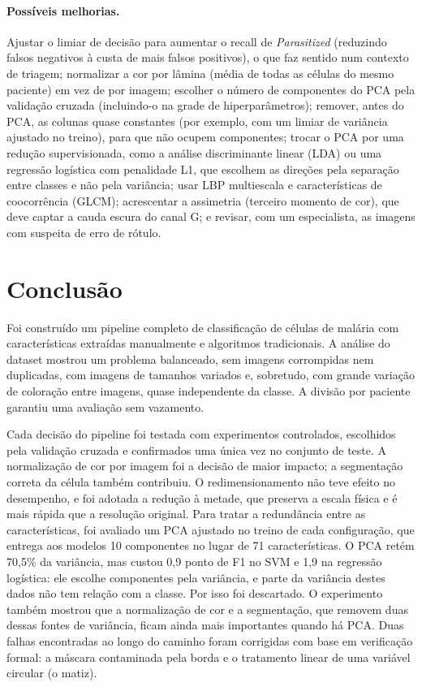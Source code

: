 \documentclass[11pt,a4paper]{article}
\begin{document}
\paragraph{Possíveis melhorias.} Ajustar o limiar de decisão para aumentar o recall de
\textit{Parasitized} (reduzindo falsos negativos à custa de mais falsos positivos), o que faz sentido
num contexto de triagem; normalizar a cor por lâmina (média de todas as células do mesmo paciente) em
vez de por imagem; escolher o número de componentes do PCA pela validação cruzada (incluindo-o na
grade de hiperparâmetros); remover, antes do PCA, as colunas quase constantes (por exemplo, com um
limiar de variância ajustado no treino), para que não ocupem componentes; trocar o PCA por uma redução
supervisionada, como a análise discriminante linear (LDA) ou uma regressão logística com penalidade
L1, que escolhem as direções pela separação entre classes e não pela variância; usar LBP multiescala e
características de coocorrência (GLCM); acrescentar a assimetria (terceiro momento de cor), que deve
captar a cauda escura do canal G; e revisar, com um especialista, as imagens com suspeita de erro de
rótulo.

\section{Conclusão}

Foi construído um pipeline completo de classificação de células de malária com características
extraídas manualmente e algoritmos tradicionais. A análise do dataset mostrou um problema
balanceado, sem imagens corrompidas nem duplicadas, com imagens de tamanhos variados e, sobretudo,
com grande variação de coloração entre imagens, quase independente da classe. A divisão por paciente
garantiu uma avaliação sem vazamento.

Cada decisão do pipeline foi testada com experimentos controlados, escolhidos pela validação cruzada
e confirmados uma única vez no conjunto de teste. A normalização de cor por imagem foi a decisão de
maior impacto; a segmentação correta da célula também contribuiu. O redimensionamento não teve efeito
no desempenho, e foi adotada a redução à metade, que preserva a escala física e é mais rápida que a
resolução original. Para tratar a redundância entre as características, foi avaliado um PCA ajustado
no treino de cada configuração, que entrega aos modelos 10 componentes no lugar de 71 características.
O PCA retém 70,5\% da variância, mas custou 0,9 ponto de F1 no SVM e 1,9 na regressão logística: ele
escolhe componentes pela variância, e parte da variância destes dados não tem relação com a classe.
Por isso foi descartado. O experimento também mostrou que a normalização de cor e a segmentação, que
removem duas dessas fontes de variância, ficam ainda mais importantes quando há PCA. Duas falhas
encontradas ao longo do caminho foram corrigidas com base em verificação formal: a máscara
contaminada pela borda e o tratamento linear de uma variável circular (o matiz).
\end{document}
